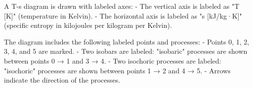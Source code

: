 A T-s diagram is drawn with labeled axes:  
- The vertical axis is labeled as "T [K]" (temperature in Kelvin).  
- The horizontal axis is labeled as "s [kJ/kg·K]" (specific entropy in kilojoules per kilogram per Kelvin).  

The diagram includes the following labeled points and processes:  
- Points 0, 1, 2, 3, 4, and 5 are marked.  
- Two isobars are labeled: "isobaric" processes are shown between points 0 → 1 and 3 → 4.  
- Two isochoric processes are labeled: "isochoric" processes are shown between points 1 → 2 and 4 → 5.  
- Arrows indicate the direction of the processes.